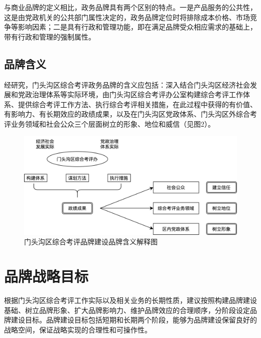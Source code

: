 \documentclass[12pt]{article} %
\begin{document}
与商业品牌的定义相比，政务品牌具有两个区别的特点。一是产品服务的公共性，这是由党政机关的公共部门属性决定的，政务品牌定位时将排除成本价格、市场竞争等影响因素；二是具有行政和管理功能，即在满足品牌受众相应需求的基础上，带有行政和管理的强制属性。

\subsection{品牌含义}
经研究，门头沟区综合考评政务品牌的含义应包括：深入结合门头沟区经济社会发展和党政治理体系等实际环境，由门头沟区综合考评办公室构建综合考评工作体系、提供综合考评工作方法、执行综合考评相关措施，在此过程中获得的有价值、有影响力、有长期效应的政绩成果，以及在门头沟区党政体系、门头沟区外综合考评业务领域和社会公众三个层面树立的形象、地位和威信（见图2）。
\begin{figure}[ht]
\centering
\includegraphics[width=\textwidth]{figures/2.png}
\caption{门头沟区综合考评品牌建设品牌含义解释图}
\label{fig:fig1}
\end{figure}

\section{品牌战略目标}
根据门头沟区综合考评工作实际以及相关业务的长期性质，建议按照构建品牌建设基础、树立品牌形象、扩大品牌影响力、维护品牌效应的合理顺序，分阶段设定品牌建设目标。品牌建设目标包括短期和长期两个阶段，能够为品牌建设保留良好的战略空间，保证战略实现的合理性和可操作性。
\end{document}
